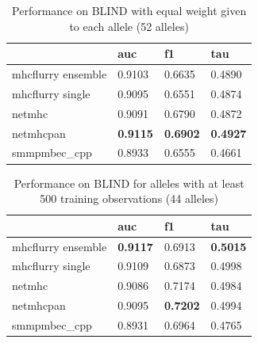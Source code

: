 \begin{table}[h]
\begin{tabular}{llll}
\toprule
{} &              auc &               f1 &              tau \\
\midrule
mhcflurry ensemble &           0.9103 &           0.6635 &           0.4890 \\
mhcflurry single   &           0.9095 &           0.6551 &           0.4874 \\
netmhc             &           0.9091 &           0.6790 &           0.4872 \\
netmhcpan          &  \textbf{0.9115} &  \textbf{0.6902} &  \textbf{0.4927} \\
smmpmbec_cpp       &           0.8933 &           0.6555 &           0.4661 \\
\bottomrule
\end{tabular}

\caption{Performance on BLIND with equal weight given to each allele (52 alleles)}
\end{table}

\begin{table}[h]
\begin{tabular}{llll}
\toprule
{} &              auc &               f1 &              tau \\
\midrule
mhcflurry ensemble &  \textbf{0.9117} &           0.6913 &  \textbf{0.5015} \\
mhcflurry single   &           0.9109 &           0.6873 &           0.4998 \\
netmhc             &           0.9086 &           0.7174 &           0.4984 \\
netmhcpan          &           0.9095 &  \textbf{0.7202} &           0.4994 \\
smmpmbec_cpp       &           0.8931 &           0.6964 &           0.4765 \\
\bottomrule
\end{tabular}

\caption{Performance on BLIND for alleles with at least 500 training observations (44 alleles)}
\end{table}

